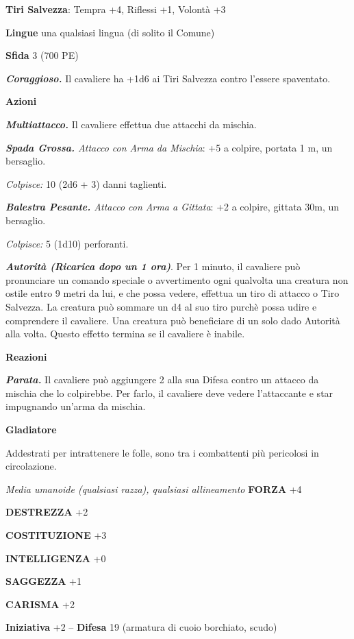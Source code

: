 \begin{multicols}{2}
\textbf{Tiri Salvezza}: Tempra +4, Riflessi +1, Volontà +3

\textbf{Lingue} una qualsiasi lingua (di solito il Comune)

\textbf{Sfida} 3 (700 PE)

\emph{\textbf{Coraggioso.}} Il cavaliere ha +1d6 ai Tiri Salvezza contro l'essere spaventato.

\textbf{Azioni}

\emph{\textbf{Multiattacco.}} Il cavaliere effettua due attacchi da mischia.

\emph{\textbf{Spada Grossa.} Attacco con Arma da Mischia}: +5 a colpire, portata 1 m, un bersaglio.

\emph{Colpisce:} 10 (2d6 + 3) danni taglienti.

\emph{\textbf{Balestra Pesante.} Attacco con Arma a Gittata}: +2 a colpire, gittata 30m, un bersaglio.

\emph{Colpisce:} 5 (1d10) perforanti.

\emph{\textbf{Autorità (Ricarica dopo un 1 ora)}}. Per 1 minuto, il cavaliere può pronunciare un comando speciale o avvertimento ogni qualvolta una creatura non ostile entro 9 metri da lui, e che possa vedere, effettua un tiro di attacco o Tiro Salvezza. La creatura può sommare un d4 al suo tiro purchè possa udire e comprendere il cavaliere. Una creatura può beneficiare di un solo dado Autorità alla volta. Questo effetto termina se il cavaliere è inabile.

\textbf{Reazioni}

\emph{\textbf{Parata.}} Il cavaliere può aggiungere 2 alla sua Difesa contro un attacco da mischia che lo colpirebbe. Per farlo, il cavaliere deve vedere l'attaccante e star impugnando un'arma da mischia.

\medskip\textbf{Gladiatore}

Addestrati per intrattenere le folle, sono tra i combattenti più pericolosi in circolazione.

\emph{Media umanoide (qualsiasi razza), qualsiasi allineamento}
\textbf{FORZA} +4

\textbf{DESTREZZA} +2

\textbf{COSTITUZIONE} +3

\textbf{INTELLIGENZA} +0

\textbf{SAGGEZZA} +1

\textbf{CARISMA} +2

\textbf{Iniziativa} +2 -- \textbf{Difesa} 19 (armatura di cuoio borchiato, scudo)


\end{multicols}
